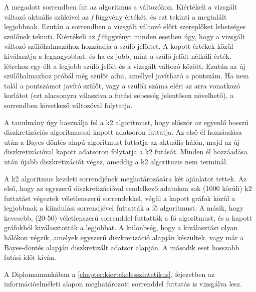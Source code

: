 A megadott sorrendben fut az algoritmus a változókon. Kiértékeli a vizsgált változó aktuális szüleivel az \emph{f} függvény értékét, és ezt tekinti a megtalált legjobbnak. Ezután a sorrendben a vizsgált változó előtt szereplőket lehetséges szülőnek tekinti. Kiértékeli az \emph{f} függvényt minden esetben úgy, hogy a vizsgált változó szülőhalmazához hozzáadja a szülő jelöltet. A kopott értékek közül kiválasztja a legnagyobbat, és ha ez jobb, mint a szülő jelölt nélküli érték, létrehoz egy élt a legjobb szülő jelölt és a vizsgált változó között. Ezután az új szülőhalmazhoz próbál még szülőt adni, amellyel javítható a pontszám. Ha nem talál a pontszámot javító szülőt, vagy a szülők száma eléri az arra vonatkozó korlátot (ezt alacsonyra választva a futási sebesség jelentősen növelhető), a sorrendben következő változóval folytatja.

A tanulmány úgy használja fel a k2 algoritmust, hogy először az egyenlő hosszú diszkretizációs algoritmussal kapott adatsoron futtatja. Az első él hozzáadása után a Bayes-döntés alapú algoritmust futtatja az aktuális hálón, majd az új diszkretizációval kapott adatsoron folytatja a k2 futását. Minden él hozzáadása után újabb diszkretizációt végez, ameddig a k2 algoritmus nem terminál.

A k2 algoritmus kezdeti sorrendjének meghatározására két ajánlatot tettek. Az első, hogy az egyszerű diszkretizációval rendelkező adatokon sok (1000 körüli) k2 futtatást végeztek véletlenszerű sorrendekkel, végül a kapott gráfok közül a legjobbnak a kiindulási sorrendjével futtatták a fő algoritmust. A másik, hogy kevesebb, (20-50) véletlenszerű sorrenddel futtatták a fő algoritmust, és a kapott gráfokból kiválasztották a legjobbat. A különbség, hogy a kiválasztást olyan hálókon végzik, amelyek egyszerű diszkretizáció alapján készültek, vagy már a Bayes-döntés alapján diszkretizált adatsor alapján. A második eset hosszabb futási időt kíván.

A Diplomamunkában a \ref{chapter:kiertekelesszintetikus}. fejezetben az információelméleti alapon meghatározott sorrenddel futtatás is vizsgálva lesz.